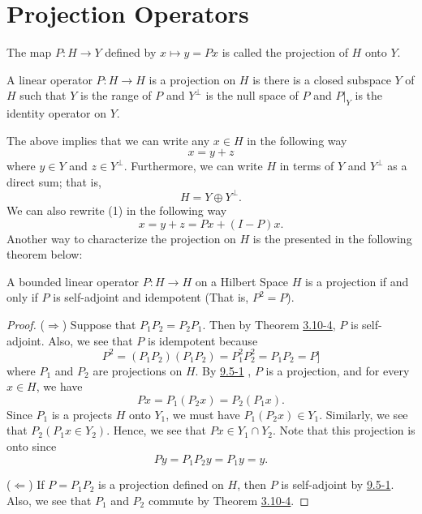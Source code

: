 \section{Projection Operators}

\begin{definition}[Projections]
    The map \( P : H \to Y  \) defined by \( x \mapsto y  = Px  \) is called the projection of \( H  \) onto \(  Y \).
\end{definition}

\begin{prop}
    A linear operator \( P : H \to H  \) is a projection on \( H  \) is there is a closed subspace \( Y  \) of \( H  \) such that \( Y  \) is the range of \( P  \) and \( Y^{\perp} \) is the null space of \( P \) and \( P |_{Y} \) is the identity operator on \( Y  \).
\end{prop}
The above implies that we can write any \( x \in H  \) in the following way
\[  x = y + z  \tag{1} \]
where \( y \in Y  \) and \( z \in Y^{\perp} \). Furthermore, we can write \( H  \) in terms of \( Y  \) and \( Y^{\perp} \) as a direct sum; that is,
\[  H = Y \oplus Y^{\perp}. \]
We can also rewrite (1) in the following way
\[  x = y + z = Px + (I-P)x. \]
Another way to characterize the projection on \( H  \) is the presented in the following theorem below:

\begin{theorem}[Projection]\label{9.5-1}
    A bounded linear operator \( P: H \to H  \) on a Hilbert Space \( H  \) is a projection if and only if \( P  \) is self-adjoint and idempotent (That is, \( P^{2} = P  \)).
\end{theorem}

\begin{proof}
    (\( \Longrightarrow \)) Suppose that \( {P}_{1} {P}_{2} = {P}_{2} {P}_{1} \). Then by Theorem {\hyperref[3.10-4]{3.10-4}}, \( P \) is self-adjoint. Also, we see that \( P \) is idempotent because
    \[  P^{2} = ({P}_{1} {P}_{2})({P}_{1} {P}_{2}) = {P}_{1}^{2} {P}_{2}^{2} = {P}_{1} {P}_{2} = P ] \]
    where \( {P}_{1}  \) and \( {P}_{2}  \) are projections on \( H  \).
    By {\hyperref[9.5-1]{9.5-1}} , \( P  \) is a projection, and for every \( x \in H  \), we have 
    \[  Px = {P}_{1}({P}_{2}x) = {P}_{2}({P}_{1}x). \]
    Since \( {P}_{1}  \) is a projects \( H  \) onto \( {Y}_{1} \), we must have \( {P}_{1}({P}_{2}x) \in {Y}_{1} \). Similarly, we see that \( {P}_{2}({P}_{1}x \in {Y}_{2}) \). Hence, we see that \( Px \in {Y}_{1} \cap {Y}_{2} \). Note that this projection is onto since   
    \[  Py = {P}_{1} {P}_{2} y = {P}_{1} y = y.  \]

    (\( \Longleftarrow \)) If \( P = {P}_{1} {P}_{2}  \) is a projection defined on \( H  \), then \( P \) is self-adjoint by {\hyperref[9.5-1]{9.5-1}}. Also, we see that \( {P}_{1} \) and \( {P}_{2} \) commute by Theorem {\hyperref[3.10-4]{3.10-4}}.
\end{proof}

